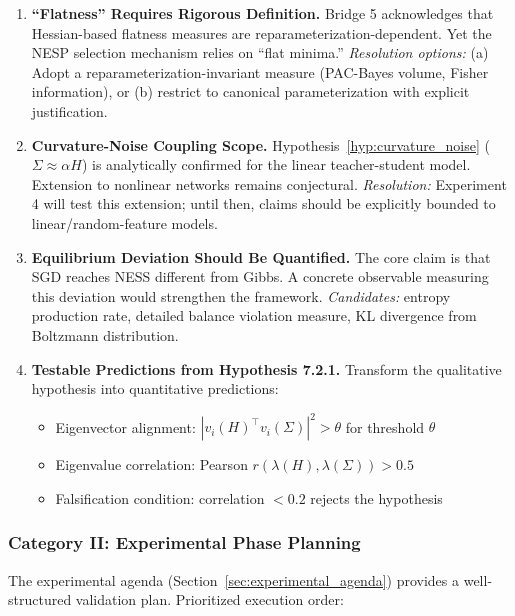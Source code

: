 \documentclass[
  journal=largetwo,
  year=2025,
  volume=37,
]{cup-journal}
\begin{document}
\begin{enumerate}
    \item \textbf{``Flatness'' Requires Rigorous Definition.} Bridge 5 acknowledges that Hessian-based flatness measures are reparameterization-dependent. Yet the NESP selection mechanism relies on ``flat minima.'' \textit{Resolution options:} (a) Adopt a reparameterization-invariant measure (PAC-Bayes volume, Fisher information), or (b) restrict to canonical parameterization with explicit justification.
    
    \item \textbf{Curvature-Noise Coupling Scope.} Hypothesis~\ref{hyp:curvature_noise} ($\Sigma \approx \alpha H$) is analytically confirmed for the linear teacher-student model. Extension to nonlinear networks remains conjectural. \textit{Resolution:} Experiment 4 will test this extension; until then, claims should be explicitly bounded to linear/random-feature models.
    
    \item \textbf{Equilibrium Deviation Should Be Quantified.} The core claim is that SGD reaches NESS different from Gibbs. A concrete observable measuring this deviation would strengthen the framework. \textit{Candidates:} entropy production rate, detailed balance violation measure, KL divergence from Boltzmann distribution.
    
    \item \textbf{Testable Predictions from Hypothesis 7.2.1.} Transform the qualitative hypothesis into quantitative predictions:
    \begin{itemize}
        \item Eigenvector alignment: $|v_i(H)^\top v_i(\Sigma)|^2 > \theta$ for threshold $\theta$
        \item Eigenvalue correlation: Pearson $r(\lambda(H), \lambda(\Sigma)) > 0.5$
        \item Falsification condition: correlation $< 0.2$ rejects the hypothesis
    \end{itemize}
\end{enumerate}

\subsubsection*{Category II: Experimental Phase Planning}

The experimental agenda (Section~\ref{sec:experimental_agenda}) provides a well-structured validation plan. Prioritized execution order:
\end{document}

